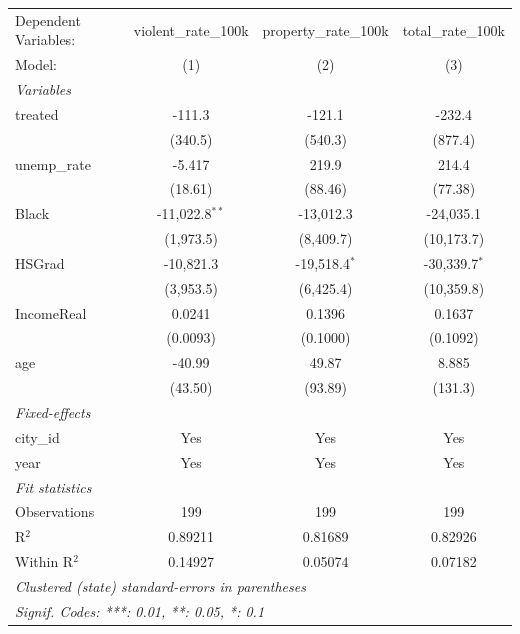 
\begingroup
\centering
\begin{tabular}{lccc}
   \tabularnewline \midrule \midrule
   Dependent Variables: & violent\_rate\_100k   & property\_rate\_100k   & total\_rate\_100k\\    
   Model:               & (1)                   & (2)                    & (3)\\  
   \midrule
   \emph{Variables}\\
   treated              & -111.3                & -121.1                 & -232.4\\   
                        & (340.5)               & (540.3)                & (877.4)\\   
   unemp\_rate          & -5.417                & 219.9                  & 214.4\\   
                        & (18.61)               & (88.46)                & (77.38)\\   
   Black                & -11,022.8$^{**}$      & -13,012.3              & -24,035.1\\   
                        & (1,973.5)             & (8,409.7)              & (10,173.7)\\   
   HSGrad               & -10,821.3             & -19,518.4$^{*}$        & -30,339.7$^{*}$\\   
                        & (3,953.5)             & (6,425.4)              & (10,359.8)\\   
   IncomeReal           & 0.0241                & 0.1396                 & 0.1637\\   
                        & (0.0093)              & (0.1000)               & (0.1092)\\   
   age                  & -40.99                & 49.87                  & 8.885\\   
                        & (43.50)               & (93.89)                & (131.3)\\   
   \midrule
   \emph{Fixed-effects}\\
   city\_id             & Yes                   & Yes                    & Yes\\  
   year                 & Yes                   & Yes                    & Yes\\  
   \midrule
   \emph{Fit statistics}\\
   Observations         & 199                   & 199                    & 199\\  
   R$^2$                & 0.89211               & 0.81689                & 0.82926\\  
   Within R$^2$         & 0.14927               & 0.05074                & 0.07182\\  
   \midrule \midrule
   \multicolumn{4}{l}{\emph{Clustered (state) standard-errors in parentheses}}\\
   \multicolumn{4}{l}{\emph{Signif. Codes: ***: 0.01, **: 0.05, *: 0.1}}\\
\end{tabular}
\par\endgroup


